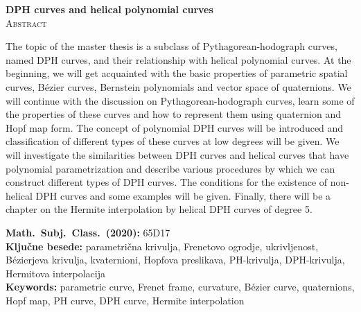 \documentclass[12pt,a4paper,twoside]{article}
\newcommand{\kljucnebesede}{parametrična krivulja\sep Frenetovo ogrodje\sep ukrivljenost\sep Bézierjeva krivulja\sep kvaternioni\sep Hopfova preslikava\sep PH-krivulja\sep DPH-krivulja\sep Hermitova interpolacija} %
\newcommand{\keywords}{parametric curve\sep Frenet frame\sep curvature\sep Bézier curve\sep quaternions\sep Hopf map\sep PH curve\sep DPH curve\sep Hermite interpolation} %
\newcommand{\sep}{, }  %
\theoremstyle{definition} %
\theoremstyle{plain} %
\theoremstyle{primerstyle}
\numberwithin{equation}{section}  %
\begin{document}
\vfill
\begin{center}
\textbf{DPH curves and helical polynomial curves} \\[3mm] %
\textsc{Abstract}\\[2mm]
\end{center}

The topic of the master thesis is a subclass of Pythagorean-hodograph curves, named DPH curves, and their relationship with helical polynomial curves. At the beginning, we will get acquainted with the basic properties of parametric spatial curves, Bézier curves, Bernstein polynomials and vector space of quaternions. We will continue with the discussion on Pythagorean-hodograph curves, learn some of the properties of these curves and how to represent them using quaternion and Hopf map form. The concept of polynomial DPH curves will be introduced and classification of different types of these curves at low degrees will be given. We will investigate the similarities between DPH curves and helical curves that have polynomial parametrization and describe various procedures by which we can construct different types of DPH curves. The conditions for the existence of non-helical DPH curves and some examples will be given. Finally, there will be a chapter on the Hermite interpolation by helical DPH curves of degree 5.

\vfill\noindent
\textbf{Math.~Subj.~Class.~(2020):} 65D17\\[1mm]%
\textbf{Ključne besede:} \kljucnebesede \\[1mm]
\textbf{Keywords:} \keywords

\cleardoublepage

\setcounter{page}{1}    %

\end{document}
